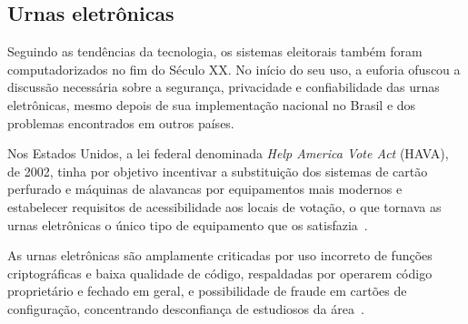 \subsection{Urnas eletrônicas}

Seguindo as tendências da tecnologia, os sistemas eleitorais também foram computadorizados no fim do Século XX. No início do seu uso, a euforia ofuscou a discussão necessária sobre a segurança, privacidade e confiabilidade das urnas eletrônicas, mesmo depois de sua implementação nacional no Brasil e dos problemas encontrados em outros países.

Nos Estados Unidos, a lei federal denominada \textit{Help America Vote Act} (HAVA), de 2002, tinha por objetivo incentivar a substituição dos sistemas de cartão perfurado e máquinas de alavancas por equipamentos mais modernos e estabelecer requisitos de acessibilidade aos locais de votação, o que tornava as urnas eletrônicas o único tipo de equipamento que os satisfazia~\cite{davis1996direct}.

As urnas eletrônicas são amplamente criticadas por uso incorreto de funções criptográficas e baixa qualidade de código, respaldadas por operarem código proprietário e fechado em geral, e possibilidade de fraude em cartões de configuração, concentrando desconfiança de estudiosos da área~\cite{kohno2004analysis,feldman2006security}.